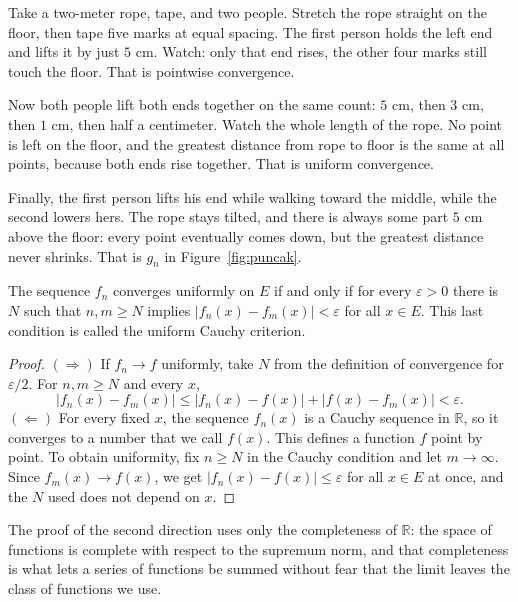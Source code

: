 \begin{tangan}
Take a two-meter rope, tape, and two people. Stretch the rope straight on the
floor, then tape five marks at equal spacing. The first person holds the left end
and lifts it by just $5$ cm. Watch: only that end rises, the other four marks
still touch the floor. That is pointwise convergence.

Now both people lift both ends together on the same count: $5$ cm, then $3$ cm,
then $1$ cm, then half a centimeter. Watch the whole length of the rope. No point is
left on the floor, and the greatest distance from rope to floor is the same at all
points, because both ends rise together. That is uniform convergence.

Finally, the first person lifts his end while walking toward the middle, while
the second lowers hers. The rope stays tilted, and there is always some part
$5$ cm above the floor: every point eventually comes down, but the greatest distance
never shrinks. That is $g_n$ in Figure~\ref{fig:puncak}.
\end{tangan}

\begin{lemma}
The sequence $f_n$ converges uniformly on $E$ if and only if for every
$\varepsilon>0$ there is $N$ such that $n,m\ge N$ implies
$|f_n(x)-f_m(x)|<\varepsilon$ for all $x\in E$. This last condition is called the
uniform Cauchy criterion.
\end{lemma}

\begin{proof}
$(\Rightarrow)$ If $f_n\to f$ uniformly, take $N$ from the definition of convergence
for $\varepsilon/2$. For $n,m\ge N$ and every $x$,
\[
  |f_n(x)-f_m(x)|\le|f_n(x)-f(x)|+|f(x)-f_m(x)|<\varepsilon .
\]
$(\Leftarrow)$ For every fixed $x$, the sequence $f_n(x)$ is a Cauchy sequence
in $\mathbb{R}$, so it converges to a number that we call $f(x)$. This
defines a function $f$ point by point. To obtain
uniformity, fix $n\ge N$ in the Cauchy condition and let
$m\to\infty$. Since $f_m(x)\to f(x)$, we get $|f_n(x)-f(x)|\le\varepsilon$
for all $x\in E$ at once, and the $N$ used does not depend on $x$.
\end{proof}

The proof of the second direction uses only the completeness of $\mathbb{R}$: the space of
functions is complete with respect to the supremum norm, and that completeness is what lets a
series of functions be summed without fear that the limit leaves the class of functions we
use.

